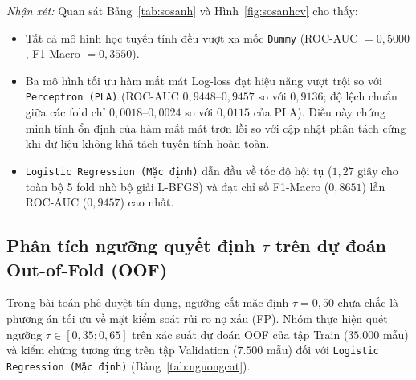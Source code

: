 \documentclass[12pt,a4paper,oneside]{report}
\begin{document}
\textit{Nhận xét:} Quan sát Bảng~\ref{tab:sosanh} và Hình~\ref{fig:sosanhcv} cho thấy:
\begin{itemize}
  \item Tất cả mô hình học tuyến tính đều vượt xa mốc \texttt{Dummy} (ROC-AUC $= 0{,}5000$, F1-Macro $= 0{,}3550$).
  \item Ba mô hình tối ưu hàm mất mát Log-loss đạt hiệu năng vượt trội so với \texttt{Perceptron (PLA)} (ROC-AUC $0{,}9448$--$0{,}9457$ so với $0{,}9136$; độ lệch chuẩn giữa các fold chỉ $0{,}0018$--$0{,}0024$ so với $0{,}0115$ của PLA). Điều này chứng minh tính ổn định của hàm mất mát trơn lồi so với cập nhật phân tách cứng khi dữ liệu không khả tách tuyến tính hoàn toàn.
  \item \texttt{Logistic Regression (Mặc định)} dẫn đầu về tốc độ hội tụ ($1{,}27\text{ giây}$ cho toàn bộ 5 fold nhờ bộ giải L-BFGS) và đạt chỉ số F1-Macro ($0{,}8651$) lẫn ROC-AUC ($0{,}9457$) cao nhất.
\end{itemize}

\subsection{Phân tích ngưỡng quyết định \texorpdfstring{$\tau$}{tau} trên dự đoán Out-of-Fold (OOF)}

Trong bài toán phê duyệt tín dụng, ngưỡng cắt mặc định $\tau = 0{,}50$ chưa chắc là phương án tối ưu về mặt kiểm soát rủi ro nợ xấu (FP). Nhóm thực hiện quét ngưỡng $\tau \in [0{,}35; 0{,}65]$ trên xác suất dự đoán OOF của tập Train ($35.000$ mẫu) và kiểm chứng tương ứng trên tập Validation ($7.500$ mẫu) đối với \texttt{Logistic Regression (Mặc định)} (Bảng~\ref{tab:nguongcat}).

\begin{table}[H]
  \caption{Khảo sát ảnh hưởng của ngưỡng xác suất $\tau$ của Logistic Regression (Mặc định).}
  \label{tab:nguongcat}
\end{table}
\end{document}

